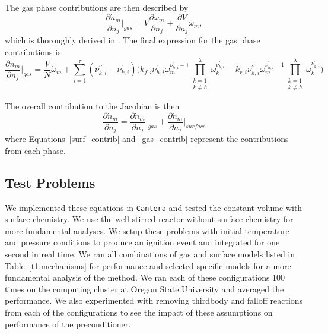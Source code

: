 \documentclass{article}
\newcommand{\sectionTwo}[1]{\subsection{#1} \addvspace{10pt}}
\def\cantera{\texttt{Cantera}}
\def\gasreactions{\tau}
\def\gasspecies{\lambda}
\def\cantera{\texttt{Cantera}}
\begin{document}
The gas phase contributions are then described by
\begin{equation}
    \frac{\partial \dot{n}_{m}}{\partial n_j}\Big\vert_{gas} = V\frac{\partial \dot{\omega}_{m}}{\partial n_j} + \frac{\partial V}{\partial n_j}\omega_{m},
\end{equation}
which is thoroughly derived in \cite{walker2022generalized}.
The final expression for the gas phase contributions is
\begin{equation}
    \label{gas_contrib}
    \frac{\partial \dot{n}_{m}}{\partial n_j}\Big\vert_{gas} = \frac{V}{N}\dot{\omega}_{m} + \sum_{i=1}^{\gasreactions}{(\nu^{\prime\prime}_{k,i}-\nu^{\prime}_{k,i})\bigg(k_{f,i}\nu^\prime_{h,i}\omega_{m}^{\nu^\prime_{h,i}-1}\prod_{\substack{k = 1 \\ k \neq h}}^{\gasspecies}{\omega_k^{\nu^{\prime}_{k,i}}} - k_{r,i}\nu^{\prime\prime}_{h,i}\omega_{m}^{\nu^{\prime\prime}_{h,i}-1}\prod_{\substack{k = 1 \\ k \neq h}}^{\gasspecies}{\omega_k^{\nu^{\prime\prime}_{k,i}}}\bigg)}
\end{equation}

The overall contribution to the Jacobian is then
\begin{equation}
    \frac{\partial \dot{n}_{m}}{\partial n_j} = \frac{\partial \dot{n}_{m}}{\partial n_j}\Big\vert_{gas} + \frac{\partial \dot{n}_{m}}{\partial n_j}\Big\vert_{surface}
\end{equation}
where Equations~\eqref{surf_contrib} and~\eqref{gas_contrib} represent the contributions from each phase.

\sectionTwo{Test Problems}
\label{sec:test-problems}
We implemented these equations in \cantera{} and tested the constant volume with surface chemistry.
We use the well-stirred reactor without surface chemistry for more fundamental analyses.
We setup these problems with initial temperature and pressure conditions to produce an ignition event and integrated for one second in real time.
We ran all combinations of gas and surface models listed in Table~\ref{t1:mechanisms} for performance and selected specific models for a more fundamental analysis of the method.
We ran each of these configurations 100 times on the computing cluster at Oregon State University and averaged the performance.
We also experimented with removing thirdbody and falloff reactions from each of the configurations to see the impact of these assumptions on performance of the preconditioner.
\end{document}
